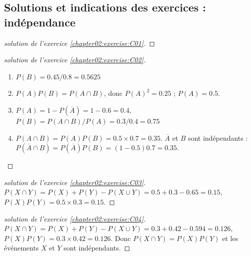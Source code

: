 \documentclass[main.tex]{subfiles}
\begin{document}
\newpage 

\subsection{Solutions et indications des exercices : indépendance}



\begin{proof}[solution de l'exercice \ref{chapter02:exercise:C01}]\hfill 

\noindent{} 
\end{proof} 



\begin{proof}[solution de l'exercice \ref{chapter02:exercise:C02}]\hfill 
	\begin{enumerate}[leftmargin=*,label=\arabic*)]
		\item $P(B)=0.45/0.8=0.5625$
		\item $P(A)P(B)=P(A\cap B)$, donc $P(A)^2=0.25$ ; $P(A)=0.5$.
		\item $P(A)=1-P(\overline{A})=1-0.6=0.4$, $P(B)=P(A\cap B)/P(A)=0.3/0.4=0.75$
		\item $P(A\cap B)=P(A)P(B)=0.5\times 0.7=0.35$. $\overline{A}$ et $B$ sont indépendants : $P(\overline{A}\cap B)=P(\overline{A})P(B)=(1-0.5)0.7=0.35$.
	\end{enumerate} 
\end{proof} 



\begin{proof}[solution de l'exercice \ref{chapter02:exercise:C03}]\hfill 

$P(X\cap Y)=P(X)+P(Y)-P(X\cup Y)=0.5+0.3-0.65=0.15$, $P(X)P(Y)=0.5\times0.3=0.15$.
\end{proof} 


\begin{proof}[solution de l'exercice \ref{chapter02:exercise:C04}]\hfill 

$P(X\cap Y)=P(X)+P(Y)-P(X\cup Y)=0.3+0.42-0.594=0.126$, $P(X)P(Y)=0.3\times 0.42=0.126$. Donc $P(X\cap Y)=P(X)P(Y)$ et les événements $X$ et $Y$ sont indépendants.
\end{proof} 
\end{document}
